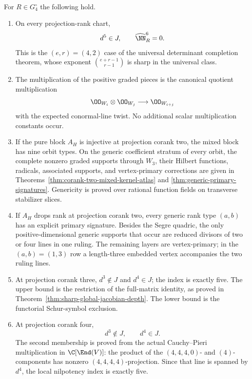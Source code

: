 \begin{theorem}
\label{thm:main-depth}
For \(R\in G_4^\circ\) the following hold.
\begin{enumerate}
\item On every projection-rank chart,
\[
 d^5\in J,\qquad \widehat\NN_R^6=0.
\]
This is the \((e,r)=(4,2)\) case of the universal determinant
completion theorem, whose exponent
\(\binom{e+r-1}{r-1}\) is sharp in the universal class.

\item The multiplication of the positive graded pieces is the
canonical quotient multiplication
\[
 \OO_{W_i}\otimes\OO_{W_j}\longrightarrow\OO_{W_{i+j}}
\]
with the expected conormal-line twist.  No additional scalar
multiplication constants occur.

\item If the pure block \(A_H\) is injective at projection corank
two, the mixed block has nine orbit types.  On the generic
coefficient stratum of every orbit, the complete nonzero graded
supports through \(W_3\), their Hilbert functions, radicals,
associated supports, and vertex-primary corrections are given in
Theorems~\ref{thm:corank-two-mixed-kernel-atlas} and
\ref{thm:generic-primary-signatures}.  Genericity is proved over
rational function fields on transverse stabilizer slices.

\item If \(A_H\) drops rank at projection corank two, every
generic rank type \((a,b)\) has an explicit primary signature.
Besides the Segre quadric, the only positive-dimensional generic
supports that occur are reduced divisors of two or four lines in one
ruling.  The remaining layers are vertex-primary; in the
\((a,b)=(1,3)\) row a length-three embedded vertex accompanies
the two ruling lines.

\item At projection corank three, \(d^3\notin J\) and
\(d^4\in J\); the index is exactly five.  The upper bound is the
restriction of the full-matrix identity, as proved in
Theorem~\ref{thm:sharp-global-jacobian-depth}.  The lower bound is
the functorial Schur-symbol exclusion.

\item At projection corank four,
\[
 d^3\notin J,\qquad d^4\in J.
\]
The second membership is proved from the actual Cauchy--Pieri
multiplication in \(\C[\End(V)]\): the product of the
\((4,4,4,0)\)- and \((4)\)-components has nonzero
\((4,4,4,4)\)-projection.  Since that line is spanned by
\(d^4\), the local nilpotency index is exactly five.
\end{enumerate}
\end{theorem}

